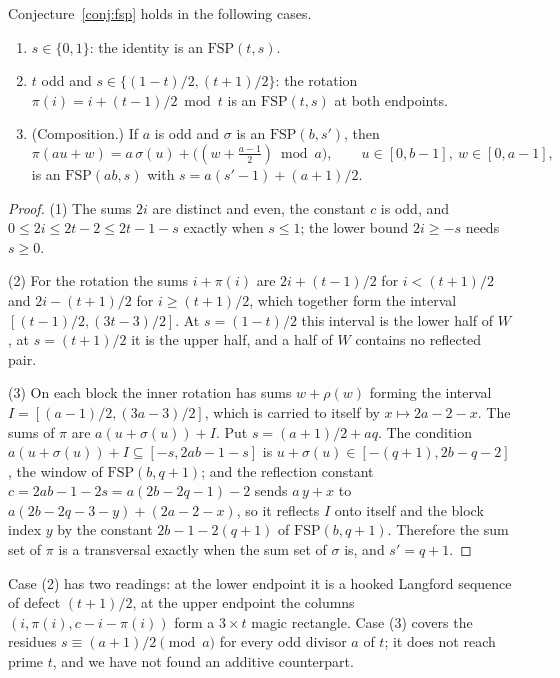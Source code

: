 \begin{proposition}\label{prop:fspcases}
Conjecture~\ref{conj:fsp} holds in the following cases.
\begin{enumerate}
\item $s\in\{0,1\}$: the identity is an $\mathrm{FSP}(t,s)$.
\item $t$ odd and $s\in\{(1-t)/2,(t+1)/2\}$: the rotation
  $\pi(i)=i+(t-1)/2 \bmod t$ is an $\mathrm{FSP}(t,s)$ at both endpoints.
\item (Composition.)  If $a$ is odd and $\sigma$ is an
  $\mathrm{FSP}(b,s')$, then
  \[
    \pi(au+w)=a\,\sigma(u)+\bigl((w+\tfrac{a-1}{2})\bmod a\bigr),\qquad
    u\in[0,b-1],\ w\in[0,a-1],
  \]
  is an $\mathrm{FSP}(ab,s)$ with $s=a(s'-1)+(a+1)/2$.
\end{enumerate}
\end{proposition}

\begin{proof}
(1) The sums $2i$ are distinct and even, the constant $c$ is odd, and
$0\le 2i\le 2t-2\le 2t-1-s$ exactly when $s\le1$; the lower bound $2i\ge-s$
needs $s\ge0$.

(2) For the rotation the sums $i+\pi(i)$ are $2i+(t-1)/2$ for
$i<(t+1)/2$ and $2i-(t+1)/2$ for $i\ge(t+1)/2$, which together form the
interval $[(t-1)/2,(3t-3)/2]$.  At $s=(1-t)/2$ this interval is the lower half
of $W$, at $s=(t+1)/2$ it is the upper half, and a half of $W$ contains no
reflected pair.

(3) On each block the inner rotation has sums $w+\rho(w)$ forming the interval
$I=[(a-1)/2,(3a-3)/2]$, which is carried to itself by $x\mapsto 2a-2-x$.  The
sums of $\pi$ are $a(u+\sigma(u))+I$.  Put $s=(a+1)/2+aq$.  The condition
$a(u+\sigma(u))+I\subseteq[-s,2ab-1-s]$ is $u+\sigma(u)\in[-(q+1),2b-q-2]$,
the window of $\mathrm{FSP}(b,q+1)$; and the reflection constant
$c=2ab-1-2s=a(2b-2q-1)-2$ sends $a\,y+x$ to $a(2b-2q-3-y)+(2a-2-x)$, so it
reflects $I$ onto itself and the block index $y$ by the constant
$2b-1-2(q+1)$ of $\mathrm{FSP}(b,q+1)$.  Therefore the sum set of $\pi$ is a
transversal exactly when the sum set of $\sigma$ is, and $s'=q+1$.
\end{proof}

Case (2) has two readings: at the lower endpoint it is a hooked Langford
sequence of defect $(t+1)/2$, at the upper endpoint the columns
$(i,\pi(i),c-i-\pi(i))$ form a $3\times t$ magic rectangle.  Case (3) covers
the residues $s\equiv(a+1)/2\pmod a$ for every odd divisor $a$ of $t$; it does
not reach prime $t$, and we have not found an additive counterpart.

